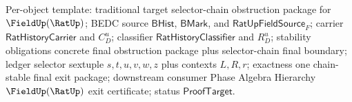 Per-object template: traditional target selector-chain obstruction package for
$\FieldUp(\RatUp)$; BEDC source $\mathsf{BHist}$, $\mathsf{BMark}$, and
$\mathsf{RatUpFieldSource}_F$; carrier $\mathsf{RatHistoryCarrier}$ and
$C_D^u$; classifier $\mathsf{RatHistoryClassifier}$ and $R_D^u$; stability
obligations concrete final obstruction package plus selector-chain final
boundary; ledger selector sextuple $s,t,u,v,w,z$ plus contexts $L,R,r$;
exactness one chain-stable final exit package; downstream consumer Phase Algebra
Hierarchy $\FieldUp(\RatUp)$ exit certificate; status $\mathsf{ProofTarget}$.
